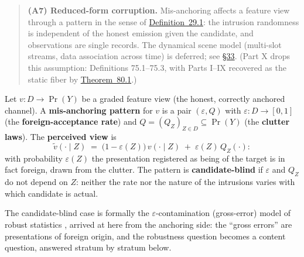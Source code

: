 \begin{quote}
\textbf{(A7) Reduced-form corruption.} Mis-anchoring affects a feature view through a pattern in the sense of \hyperlink{stmt:29.1}{Definition~29.1}: the intrusion randomness is independent of the honest emission given the candidate, and observations are single records. The dynamical scene model (multi-slot streams, data association across time) is deferred; see \hyperlink{sec:33}{§33}. (Part X drops this assumption: Definitions 75.1--75.3, with Parts I--IX recovered as the static fiber by \hyperlink{stmt:80.1}{Theorem~80.1}.)
\end{quote}

\begin{thmdef}

Let \(v : D \to \Pr(Y)\) be a graded feature view (the honest, correctly anchored channel). A \textbf{mis-anchoring pattern} for \(v\) is a pair \((\varepsilon, Q)\) with \(\varepsilon : D \to [0,1]\) (the \textbf{foreign-acceptance rate}) and \(Q = (Q_Z)_{Z \in D} \subseteq \Pr(Y)\) (the \textbf{clutter laws}). The \textbf{perceived view} is
\[
\tilde v(\cdot \mid Z) \;=\; \big(1 - \varepsilon(Z)\big)\, v(\cdot \mid Z) \;+\; \varepsilon(Z)\, Q_Z(\cdot):
\]
with probability \(\varepsilon(Z)\) the presentation registered as being of the target is in fact foreign, drawn from the clutter. The pattern is \textbf{candidate-blind} if \(\varepsilon\) and \(Q_Z\) do not depend on \(Z\): neither the rate nor the nature of the intrusions varies with which candidate is actual.
\end{thmdef}

The candidate-blind case is formally the \(\varepsilon\)-contamination (gross-error) model of robust statistics \autocite{huber1964}, arrived at here from the anchoring side: the ``gross errors'' are presentations of foreign origin, and the robustness question becomes a content question, answered stratum by stratum below.

